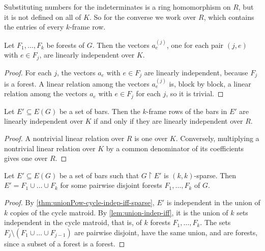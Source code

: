 Substituting numbers for the indeterminates is a ring homomorphism on
$R$, but it is not defined on all of $K$. So for the converse we work
over $R$, which contains the entries of every $k$-frame row.

\begin{lemma}
  \label{lem:k-frame-specialize-li}
  \leanok
  Let $F_1, \dots, F_k$ be forests of $G$. Then the vectors
  $a_e^{(j)}$, one for each pair $(j, e)$ with $e \in F_j$, are
  linearly independent over $K$.
\end{lemma}
\begin{proof}
  \leanok
  For each $j$, the vectors $a_e$ with $e \in F_j$ are linearly
  independent, because $F_j$ is a forest. A linear relation among the
  vectors $a_e^{(j)}$ is, block by block, a linear relation among the
  vectors $a_e$ with $e \in F_j$ for each $j$, so it is trivial.
\end{proof}

\begin{lemma}
  \label{lem:k-frame-li-over-poly-ring}
  \leanok
  Let $E' \subseteq E(G)$ be a set of bars. Then the $k$-frame rows of
  the bars in $E'$ are linearly independent over $K$ if and only if they
  are linearly independent over $R$.
\end{lemma}
\begin{proof}
  \leanok
  A nontrivial linear relation over $R$ is one over $K$. Conversely,
  multiplying a nontrivial linear relation over $K$ by a common
  denominator of its coefficients gives one over $R$.
\end{proof}

\begin{lemma}
  \label{lem:k-frame-forest-packing-of-sparse}
  \leanok
  Let $E' \subseteq E(G)$ be a set of bars such that $G \restriction E'$
  is $(k, k)$-sparse. Then $E' = F_1 \cup \dots \cup F_k$ for some
  pairwise disjoint forests $F_1, \dots, F_k$ of $G$.
\end{lemma}
\begin{proof}
  \leanok
  By \cref{thm:unionPow-cycle-indep-iff-sparse}, $E'$ is independent in
  the union of $k$ copies of the cycle matroid. By
  \cref{lem:union-indep-iff}, it is the union of $k$ sets independent in
  the cycle matroid, that is, of $k$ forests $F_1, \dots, F_k$. The sets
  $F_j \setminus (F_1 \cup \dots \cup F_{j-1})$ are pairwise disjoint,
  have the same union, and are forests, since a subset of a forest is a
  forest.
\end{proof}

